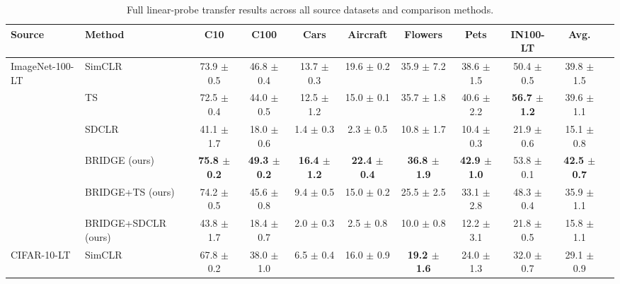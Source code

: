 \begin{table}[H]
\centering
\tiny
\setlength{\tabcolsep}{3.5pt}
\caption{Full linear-probe transfer results across all source datasets and comparison methods.}
\label{tab:app_sota_linear_full}
\begin{adjustbox}{width=\textwidth}
\begin{tabular}{l l c c c c c c c c c}
\toprule
Source & Method & C10 & C100 & Cars & Aircraft & Flowers & Pets & IN100-LT & Avg. \\
\midrule
ImageNet-100-LT & SimCLR & 73.9 {\scriptsize$\pm$ 0.5} & 46.8 {\scriptsize$\pm$ 0.4} & 13.7 {\scriptsize$\pm$ 0.3} & 19.6 {\scriptsize$\pm$ 0.2} & 35.9 {\scriptsize$\pm$ 7.2} & 38.6 {\scriptsize$\pm$ 1.5} & 50.4 {\scriptsize$\pm$ 0.5} & 39.8 {\scriptsize$\pm$ 1.5} \\
 & TS & 72.5 {\scriptsize$\pm$ 0.4} & 44.0 {\scriptsize$\pm$ 0.5} & 12.5 {\scriptsize$\pm$ 1.2} & 15.0 {\scriptsize$\pm$ 0.1} & 35.7 {\scriptsize$\pm$ 1.8} & 40.6 {\scriptsize$\pm$ 2.2} & \textbf{56.7 {\scriptsize$\pm$ 1.2}} & 39.6 {\scriptsize$\pm$ 1.1} \\
 & SDCLR & 41.1 {\scriptsize$\pm$ 1.7} & 18.0 {\scriptsize$\pm$ 0.6} & 1.4 {\scriptsize$\pm$ 0.3} & 2.3 {\scriptsize$\pm$ 0.5} & 10.8 {\scriptsize$\pm$ 1.7} & 10.4 {\scriptsize$\pm$ 0.3} & 21.9 {\scriptsize$\pm$ 0.6} & 15.1 {\scriptsize$\pm$ 0.8} \\
 & BRIDGE (ours) & \textbf{75.8 {\scriptsize$\pm$ 0.2}} & \textbf{49.3 {\scriptsize$\pm$ 0.2}} & \textbf{16.4 {\scriptsize$\pm$ 1.2}} & \textbf{22.4 {\scriptsize$\pm$ 0.4}} & \textbf{36.8 {\scriptsize$\pm$ 1.9}} & \textbf{42.9 {\scriptsize$\pm$ 1.0}} & 53.8 {\scriptsize$\pm$ 0.1} & \textbf{42.5 {\scriptsize$\pm$ 0.7}} \\
 & BRIDGE+TS (ours) & 74.2 {\scriptsize$\pm$ 0.5} & 45.6 {\scriptsize$\pm$ 0.8} & 9.4 {\scriptsize$\pm$ 0.5} & 15.0 {\scriptsize$\pm$ 0.2} & 25.5 {\scriptsize$\pm$ 2.5} & 33.1 {\scriptsize$\pm$ 2.8} & 48.3 {\scriptsize$\pm$ 0.4} & 35.9 {\scriptsize$\pm$ 1.1} \\
 & BRIDGE+SDCLR (ours) & 43.8 {\scriptsize$\pm$ 1.7} & 18.4 {\scriptsize$\pm$ 0.7} & 2.0 {\scriptsize$\pm$ 0.3} & 2.5 {\scriptsize$\pm$ 0.8} & 10.0 {\scriptsize$\pm$ 0.8} & 12.2 {\scriptsize$\pm$ 3.1} & 21.8 {\scriptsize$\pm$ 0.5} & 15.8 {\scriptsize$\pm$ 1.1} \\
\midrule
CIFAR-10-LT & SimCLR & 67.8 {\scriptsize$\pm$ 0.2} & 38.0 {\scriptsize$\pm$ 1.0} & 6.5 {\scriptsize$\pm$ 0.4} & 16.0 {\scriptsize$\pm$ 0.9} & \textbf{19.2 {\scriptsize$\pm$ 1.6}} & 24.0 {\scriptsize$\pm$ 1.3} & 32.0 {\scriptsize$\pm$ 0.7} & 29.1 {\scriptsize$\pm$ 0.9} \\

\end{tabular}
\end{adjustbox}
\end{table}
